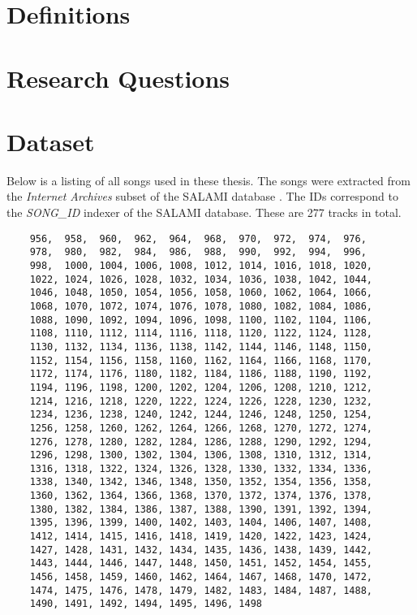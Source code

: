 \chapter{Definitions}
\printProofs[def]

\chapter{Research Questions}
\printProofs[rq]

\chapter{Dataset}
\label{app:dataset}
Below is a listing of all songs used in these thesis. The songs were extracted from the \textit{Internet Archives} subset of the SALAMI database \cite{Salami}. The IDs correspond to the \textit{SONG\_ID} indexer of the SALAMI database. These are 277 tracks in total.
\begin{verbatim}
    956,  958,  960,  962,  964,  968,  970,  972,  974,  976,
    978,  980,  982,  984,  986,  988,  990,  992,  994,  996, 
    998,  1000, 1004, 1006, 1008, 1012, 1014, 1016, 1018, 1020, 
    1022, 1024, 1026, 1028, 1032, 1034, 1036, 1038, 1042, 1044, 
    1046, 1048, 1050, 1054, 1056, 1058, 1060, 1062, 1064, 1066, 
    1068, 1070, 1072, 1074, 1076, 1078, 1080, 1082, 1084, 1086, 
    1088, 1090, 1092, 1094, 1096, 1098, 1100, 1102, 1104, 1106, 
    1108, 1110, 1112, 1114, 1116, 1118, 1120, 1122, 1124, 1128, 
    1130, 1132, 1134, 1136, 1138, 1142, 1144, 1146, 1148, 1150, 
    1152, 1154, 1156, 1158, 1160, 1162, 1164, 1166, 1168, 1170, 
    1172, 1174, 1176, 1180, 1182, 1184, 1186, 1188, 1190, 1192, 
    1194, 1196, 1198, 1200, 1202, 1204, 1206, 1208, 1210, 1212, 
    1214, 1216, 1218, 1220, 1222, 1224, 1226, 1228, 1230, 1232, 
    1234, 1236, 1238, 1240, 1242, 1244, 1246, 1248, 1250, 1254, 
    1256, 1258, 1260, 1262, 1264, 1266, 1268, 1270, 1272, 1274, 
    1276, 1278, 1280, 1282, 1284, 1286, 1288, 1290, 1292, 1294, 
    1296, 1298, 1300, 1302, 1304, 1306, 1308, 1310, 1312, 1314, 
    1316, 1318, 1322, 1324, 1326, 1328, 1330, 1332, 1334, 1336, 
    1338, 1340, 1342, 1346, 1348, 1350, 1352, 1354, 1356, 1358, 
    1360, 1362, 1364, 1366, 1368, 1370, 1372, 1374, 1376, 1378, 
    1380, 1382, 1384, 1386, 1387, 1388, 1390, 1391, 1392, 1394, 
    1395, 1396, 1399, 1400, 1402, 1403, 1404, 1406, 1407, 1408, 
    1412, 1414, 1415, 1416, 1418, 1419, 1420, 1422, 1423, 1424, 
    1427, 1428, 1431, 1432, 1434, 1435, 1436, 1438, 1439, 1442, 
    1443, 1444, 1446, 1447, 1448, 1450, 1451, 1452, 1454, 1455, 
    1456, 1458, 1459, 1460, 1462, 1464, 1467, 1468, 1470, 1472, 
    1474, 1475, 1476, 1478, 1479, 1482, 1483, 1484, 1487, 1488, 
    1490, 1491, 1492, 1494, 1495, 1496, 1498
\end{verbatim}